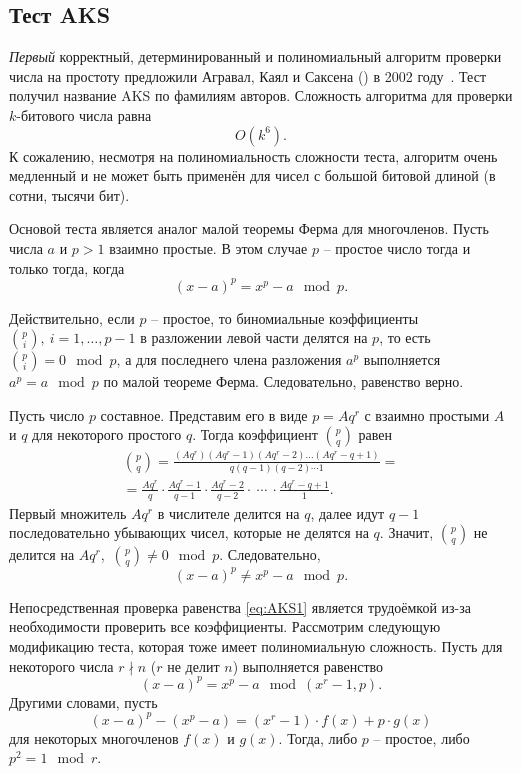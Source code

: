 \subsection{Тест AKS}\label{section-prime-check-aks}

\emph{Первый} корректный, детерминированный и полиномиальный алгоритм проверки числа на простоту предложили Агравал, Каял и Саксена () в 2002 году~\cite{aks:2002}. Тест получил название AKS по фамилиям авторов. Сложность алгоритма для проверки $k$-битового числа равна
    \[ O(k^{6}). \]
К сожалению, несмотря на полиномиальность сложности теста, алгоритм очень медленный и не может быть применён для чисел с большой битовой длиной (в сотни, тысячи бит).

Основой теста является аналог малой теоремы Ферма для многочленов. Пусть числа $a$ и $p>1$ взаимно простые. В этом случае $p$ -- простое число тогда и только тогда, когда
\begin{equation}
    \label{eq:AKS1}
    (x - a)^p = x^p - a \mod p.
\end{equation}

Действительно, если $p$ -- простое, то биномиальные коэффициенты $\binom{p}{i},\ i = 1, \dots, p-1$ в разложении левой части делятся на $p$, то есть~$\binom{p}{i} = 0 \mod p$, а для последнего члена разложения $a^p$ выполняется $a^p = a \mod p$ по малой теореме Ферма. Следовательно, равенство верно.

Пусть число $p$ составное. Представим его в виде $p = A q^r$ с взаимно простыми $A$ и $q$ для некоторого простого $q$. Тогда коэффициент $\binom{p}{q}$ равен
\begin{multline*} 
\binom{p}{q}  = \frac{(A q^r) (A q^r - 1)(A q^r - 2) \dots (A q^r - q + 1)}{q (q-1)(q-2) \cdots 1} = \\ 
= \frac{A q^r}{q} \cdot \frac{A q^r - 1}{q-1} \cdot \frac{A q^r - 2}{q-2} \cdot ~\cdots~ \cdot \frac{A q^r - q + 1}{1}. 
\end{multline*}
Первый множитель $A q^r$ в числителе делится на $q$, далее идут \mbox{$q-1$} последовательно убывающих чисел, которые не делятся на $q$. Значит, $\binom{p}{q}$ не делится на $A q^r$,~$\binom{p}{q} \neq 0 \mod p$. Следовательно,
\[
(x - a)^p \neq x^p - a \mod p.
\]

Непосредственная проверка равенства \eqref{eq:AKS1} является трудоёмкой из-за необходимости проверить все коэффициенты. Рассмотрим следующую модификацию теста, которая тоже имеет полиномиальную сложность. Пусть для некоторого числа $r \nmid n$ ($r$ не делит $n$) выполняется равенство
\begin{equation}
    \label{eq:AKS2}
    (x - a)^p = x^p - a \mod (x^r-1, p).
\end{equation}
Другими словами, пусть
    \[ (x - a)^p - (x^p - a) = (x^r-1) \cdot f(x) + p \cdot g(x) \]
для некоторых многочленов $f(x)$ и $g(x)$. Тогда, либо $p$ -- простое, либо $p^2 = 1 \mod r$.

